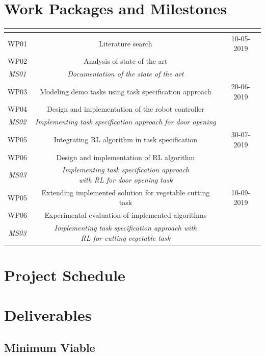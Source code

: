 \documentclass[thesis]{mas_proposal}
\begin{document}
\section{Work Packages and Milestones}

\begin{tabular}{|c|c|c|}

	\hline
	\multicolumn{2}{|c|}{\thead{Work Packages}} & \thead{Targeted date} \\
	\hline
	WP01 & Literature search & 10-05-2019 \\
	WP02 & Analysis of state of the art &  \\
	\textit{MS01} & \textit{Documentation of the state of the art} &  \\
	\hline 
	WP03 & Modeling demo tasks using task specification approach &  20-06-2019\\ 
	WP04 & Design and implementation of the robot controller &   \\
	\textit{MS02} & \textit{Implementing task specification approach for door opening} &  \\
	\hline
	WP05 & Integrating RL algorithm in task specification & 30-07-2019 \\ 
	WP06 & Design and implementation of RL algorithm &   \\
	\textit{MS03} & \makecell{\textit{Implementing task specification approach} \\ \textit{with RL for door opening task}} &  \\
	\hline
	WP05 & Extending implemented solution for vegetable cutting task & 10-09-2019 \\ 
	WP06 & Experimental evaluation of implemented algorithms &  \\
	\textit{MS03} & \makecell{\textit{Implementing task specification approach with} \\ \textit{RL for cutting vegetable task}} &  \\
	\hline
\end{tabular}


\section{Project Schedule}



\section{Deliverables}
\subsection{Minimum Viable}
\end{document}
